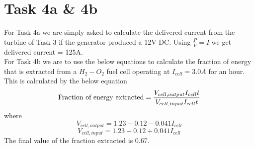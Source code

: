 \documentclass[11pt,a4paper]{article}
\begin{document}
\section*{Task 4a \& 4b}
For Task 4a we are simply asked to calculate the delivered current from the turbine of Task 3 if the generator produced a 12V DC. Using $\frac{P}{V} = I$ we get delivered current = 125A. \\ 
For Task 4b we are to use the below equations to calculate the fraction of energy that is extracted from a $H_2-O_2$ fuel cell operating at $I_{cell} = 3.0 A$ for an hour. This is calculated by the below equation
\[\textnormal{Fraction of energy extracted} = \frac{V_{cell,output} I_{cell} t}{V_{cell,input} I_{cell} t}\]
where \[V_{cell,output} = 1.23 - 0.12 - 0.041I_{cell}\] \[V_{cell,input} = 1.23 + 0.12 + 0.041I_{cell}\]
The final value of the fraction extracted is 0.67. 
\end{document}

